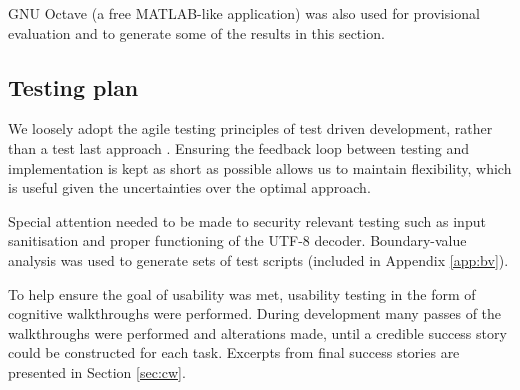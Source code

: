 GNU Octave (a free MATLAB-like application) was also used for provisional evaluation and to generate some of the results in this section.


\subsection{Testing plan}

We loosely adopt the agile testing principles of test driven development, rather than a test last approach \cite{agile-test}. Ensuring the feedback loop between testing and implementation is kept as short as possible allows us to maintain flexibility, which is useful given the uncertainties over the optimal approach.

Special attention needed to be made to security relevant testing such as input sanitisation and proper functioning of the UTF-8 decoder. Boundary-value analysis was used to generate sets of test scripts (included in Appendix \ref{app:bv}).

To help ensure the goal of usability was met, usability testing in the form of cognitive walkthroughs were performed. During development many passes of the walkthroughs were performed and alterations made, until a credible success story could be constructed for each task. Excerpts from final success stories are presented in Section \ref{sec:cw}.


